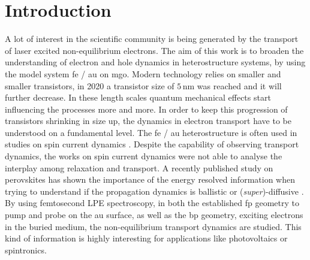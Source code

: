 \documentclass[a4paper,12pt,twoside]{article}
\begin{document}
\tableofcontents
\newpage
\listoffigures
{}
\listoftables
{}
\printglossary[type=\acronymtype]
\newpage
\null
\thispagestyle{empty}
\newpage
{}
\renewcommand{\baselinestretch}{1.2}\normalsize

    \section{Introduction}
        \label{Ichap}
A lot of interest in the scientific community is being generated by the transport of laser excited non-equilibrium electrons. The aim of this work is to broaden the understanding of electron and hole dynamics in heterostructure systems, by using the model system \gls{fe} / \gls{au} on \gls{mgo}. Modern technology relies on smaller and smaller transistors, in 2020 a transistor size of $5\,\mathrm{nm}$ was reached and it will further decrease. In these length scales quantum mechanical effects start influencing the processes more and more. In order to keep this progression of transistors shrinking in size up, the dynamics in electron transport have to be understood on a fundamental level. The \gls{fe} / \gls{au} heterostructure is often used in studies on spin current dynamics \cite{Alekhin2017,Buhlmann2020,Melnikov2011}. Despite the capability of observing transport dynamics, the works on spin current dynamics were not able to analyse the interplay among relaxation and transport. A recently published study on perovskites has shown the importance of the energy resolved information when trying to understand if the propagation dynamics is ballistic or (\textit{super})-diffusive \cite{Sung2020}. By using femtosecond \gls{LPE} spectroscopy, in both the established \gls{fp} geometry to pump and probe on the \gls{au} surface, as well as the \gls{bp} geometry, exciting electrons in the buried medium, the non-equilibrium transport dynamics are studied. This kind of information is highly interesting for applications like photovoltaics or spintronics. 
\\
\end{document}
